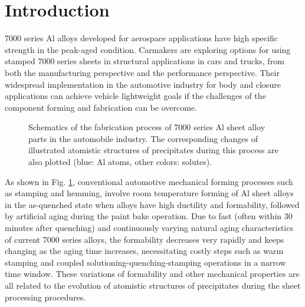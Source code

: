 \section{Introduction}
\label{Chap:Al/Vac:section:Intro}

7000 series Al alloys developed for aerospace applications have high specific strength in the peak-aged condition. Carmakers are exploring options for using stamped 7000 series sheets in structural applications in cars and trucks, from both the manufacturing perspective and the performance perspective. Their widespread implementation in the automotive industry for body and closure applications can achieve vehicle lightweight goals if the challenges of the component forming and fabrication can be overcome. \cite{fridlyander2002aluminum,hirsch2011aluminium,hirsch2014recent}

\begingroup
\begin{figure}[!ht]
  \centering
\caption[Schematics of the fabrication process of 7000 series Al sheet alloy parts in the automobile industry.]{Schematics of the fabrication process of 7000 series Al sheet alloy parts in the automobile industry. The corresponding changes of illustrated atomistic structures of precipitates during this process are also plotted (blue: Al atoms, other colors: solutes).}
  \label{Chap:Al/Vac:fig1}
\end{figure}
\endgroup

As shown in Fig. \ref{Chap:Al/Vac:fig1}, conventional automotive mechanical forming processes such as stamping and hemming, involve room temperature forming of Al sheet alloys in the as-quenched state when alloys have high ductility and formability, followed by artificial aging during the paint bake operation. Due to fast (often within 30 minutes after quenching) and continuously varying natural aging characteristics of current 7000 series alloys, the formability decreases very rapidly and keeps changing as the aging time increases, necessitating costly steps such as warm stamping and coupled solutioning-quenching-stamping operations in a narrow time window. \cite{bryant1999effects,li2004biaxial} These variations of formability and other mechanical properties are all related to the evolution of atomistic structures of precipitates during the sheet processing procedures.

